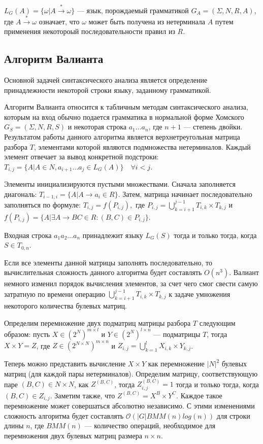\documentclass[14pt]{matmex-diploma-custom}
\begin{document}
$L_{G}(A) = \{ \omega | A\xrightarrow{*} \omega\}$ --- язык, порождаемый грамматикой $G_{A} = (\Sigma, N, R, A)$, где $A \xrightarrow{*} \omega$ означает, что $\omega$ может быть получена из нетерминала $A$ путем применения некотороый последовательности правил из $R$.

\subsection{Алгоритм Валианта}

Основной задачей синтаксического анализа является определение принадлежности некоторой строки языку, заданному грамматикой.

Алгоритм Валианта относится к табличным методам синтаксического анализа, которым на вход обычно подается грамматика в нормальной форме Хомского $G_S = (\Sigma, N, R, S)$ и некоторая строка $a_{1} \dots a_{n}$, где $n + 1$ --- степень двойки. Результатом работы данного алгоритма является верхнетреугольная матрица разбора $T$, элементами которой являются подмножества нетерминалов. Каждый элемент отвечает за вывод конкретной подстроки: $T_{i, j} =  \{ A | A \in N, a_{i + 1} \dots a_{j} \in L_{G}(A)\} \quad \forall i < j$.

Элементы инициализируются пустыми множествами.
Сначала заполняется диагональ: $T_{i - 1, i} = \{ A | A \rightarrow a_{i} \in R\}.$ 
Затем, матрица начинает последовательно заполняться по формуле:
$T_{i, j} = f(P_{i, j}),$ 
где $P_{i, j} = \bigcup\limits_{k = i + 1}^{j - 1} T_{i,k} \times T_{k, j}$ и
$f(P_{i, j}) = \{A | \exists A \rightarrow BC \in R : (B, C) \in P_{i, j}\}.$

Входная строка $a_{1}a_{2} \dots a_{n}$ принадлежит языку $L_{G}(S)$ тогда и только тогда, когда $S \in T_{0, n}$.

Если все элементы данной матрицы заполнять последовательно, то вычислительная сложность данного алгоритма будет составлять $O(n^3)$. Валиант немного изменил порядок вычисления элементов, за счет чего смог свести самую затратную по времени операцию $\bigcup\limits_{k = i + 1}^{j - 1} T_{i, k} \times T_{k, j}$ к задаче умножения некоторого количества булевых матриц.

Определим перемножение двух подматриц матрицы разбора $T$ следующим образом: пусть $X \in (2^N)^{m \times l}$ и $Y \in (2^N)^{l \times n}$ --- подматрицы $T$, тогда $X \times Y = Z$, где $Z \in (2^{N \times N})^{m \times n}$ и $Z_{i, j} = \bigcup\limits_{k = 1}^{l} X_{i, k} \times Y_{k, j}$.

Теперь можно представить вычисление $X \times Y$ как перемножение $|N|^2$ булевых матриц (для каждой пары нетерминалов).
Определим матрицу, соответствующую паре $(B, C) \in N \times N$, как $Z^{(B, C)}$, тогда $Z_{i, j}^{(B, C)} = 1$ тогда и только тогда, когда $(B, C) \in Z_{i, j}$.
Заметим также, что $Z^{(B, C)} = X^{B} \times Y^{C}$.
Каждое такое перемножение может совершаться абсолютно независимо.
С этими изменениями сложность алгоритма будет составлять $\mathcal{O}(|G|BMM(n)log(n))$ для строки длины $n$, где $BMM(n)$ --- количество операций, необходимое для перемножения двух булевых матриц размера $n \times n$.
\end{document}
